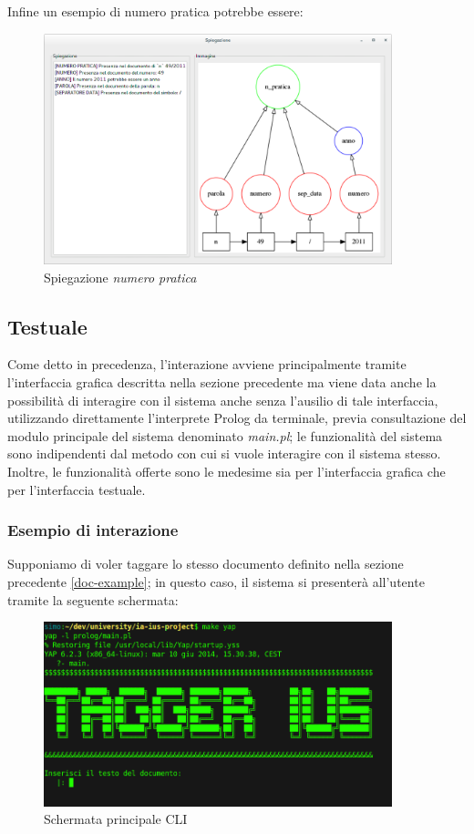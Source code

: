 Infine un esempio di numero pratica potrebbe essere:

\begin{figure}[H]
	\centering
	\includegraphics[width=0.9\textwidth]{img/interfaces/java-pratica.png}
	\caption[Schermata java explain numero pratica]{Spiegazione \emph{numero pratica}}
	\label{java-pratica}
\end{figure}

\subsection{Testuale}
Come detto in precedenza, l’interazione avviene principalmente tramite l'interfaccia grafica descritta nella sezione precedente ma viene data anche la possibilità di interagire con il sistema anche senza l'ausilio di tale interfaccia, utilizzando direttamente l'interprete Prolog da terminale, previa consultazione del modulo principale del sistema denominato \emph{main.pl}; le funzionalità del sistema sono indipendenti dal metodo con cui si vuole interagire con il sistema stesso. Inoltre, le funzionalità offerte sono le medesime sia per l'interfaccia grafica che per l'interfaccia testuale.

\subsubsection{Esempio di interazione}
Supponiamo di voler taggare lo stesso documento definito nella sezione precedente \ref{doc-example}; in questo caso, il sistema si presenterà all'utente tramite la seguente schermata:

\begin{figure}[H]
	\centering
	\includegraphics[width=0.9\textwidth]{img/interfaces/CLI-main.png}
	\caption[Schermata CLI main]{Schermata principale CLI}
	\label{CLI-main}
\end{figure}


